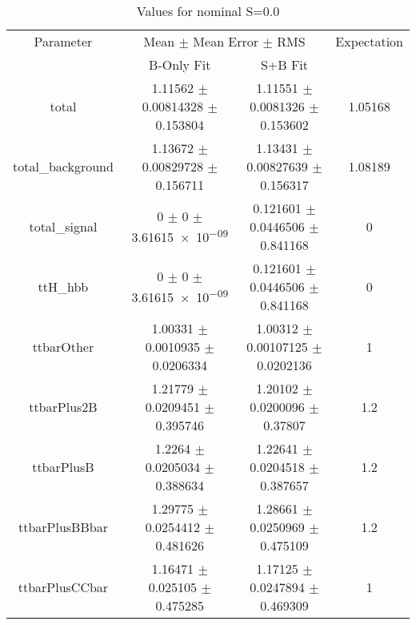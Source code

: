 \begin{table}
\centering
\caption{Values for nominal S=0.0}
\begin{tabular}{cccc}
\toprule
Parameter & \multicolumn{2}{c}{Mean $\pm$ Mean Error $\pm$ RMS} & Expectation\\
 & B-Only Fit & S+B Fit & \\
\midrule
total & \num{1.11562} $\pm$ \num{0.00814328} $\pm$ \num{0.153804} & \num{1.11551} $\pm$ \num{0.0081326} $\pm$ \num{0.153602} & \num{1.05168}\\
total\_background & \num{1.13672} $\pm$ \num{0.00829728} $\pm$ \num{0.156711} & \num{1.13431} $\pm$ \num{0.00827639} $\pm$ \num{0.156317} & \num{1.08189}\\
total\_signal & \num{0} $\pm$ \num{0} $\pm$ \num{3.61615e-09} & \num{0.121601} $\pm$ \num{0.0446506} $\pm$ \num{0.841168} & \num{0}\\
ttH\_hbb & \num{0} $\pm$ \num{0} $\pm$ \num{3.61615e-09} & \num{0.121601} $\pm$ \num{0.0446506} $\pm$ \num{0.841168} & \num{0}\\
ttbarOther & \num{1.00331} $\pm$ \num{0.0010935} $\pm$ \num{0.0206334} & \num{1.00312} $\pm$ \num{0.00107125} $\pm$ \num{0.0202136} & \num{1}\\
ttbarPlus2B & \num{1.21779} $\pm$ \num{0.0209451} $\pm$ \num{0.395746} & \num{1.20102} $\pm$ \num{0.0200096} $\pm$ \num{0.37807} & \num{1.2}\\
ttbarPlusB & \num{1.2264} $\pm$ \num{0.0205034} $\pm$ \num{0.388634} & \num{1.22641} $\pm$ \num{0.0204518} $\pm$ \num{0.387657} & \num{1.2}\\
ttbarPlusBBbar & \num{1.29775} $\pm$ \num{0.0254412} $\pm$ \num{0.481626} & \num{1.28661} $\pm$ \num{0.0250969} $\pm$ \num{0.475109} & \num{1.2}\\
ttbarPlusCCbar & \num{1.16471} $\pm$ \num{0.025105} $\pm$ \num{0.475285} & \num{1.17125} $\pm$ \num{0.0247894} $\pm$ \num{0.469309} & \num{1}\\
\bottomrule
\end{tabular}
\end{table}